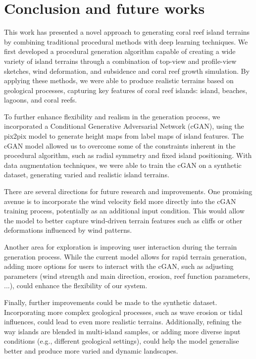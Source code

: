 \section{Conclusion and future works}
\label{sec:coral-island-conclusion}

This work has presented a novel approach to generating coral reef island terrains by combining traditional procedural methods with deep learning techniques. We first developed a procedural generation algorithm capable of creating a wide variety of island terrains through a combination of top-view and profile-view sketches, wind deformation, and subsidence and coral reef growth simulation. By applying these methods, we were able to produce realistic terrains based on geological processes, capturing key features of coral reef islands: island, beaches, lagoons, and coral reefs.

To further enhance flexibility and realism in the generation process, we incorporated a Conditional Generative Adversarial Network (cGAN), using the pix2pix model to generate height maps from label maps of island features. The cGAN model allowed us to overcome some of the constraints inherent in the procedural algorithm, such as radial symmetry and fixed island positioning. With data augmentation techniques, we were able to train the cGAN on a synthetic dataset, generating varied and realistic island terrains.


There are several directions for future research and improvements. One promising avenue is to incorporate the wind velocity field more directly into the cGAN training process, potentially as an additional input condition. This would allow the model to better capture wind-driven terrain features such as cliffs or other deformations influenced by wind patterns.

Another area for exploration is improving user interaction during the terrain generation process. While the current model allows for rapid terrain generation, adding more options for users to interact with the cGAN, such as adjusting parameters (wind strength and main direction, erosion, reef function parameters, ...), could enhance the flexibility of our system.

Finally, further improvements could be made to the synthetic dataset. Incorporating more complex geological processes, such as wave erosion or tidal influences, could lead to even more realistic terrains. Additionally, refining the way islands are blended in multi-island samples, or adding more diverse input conditions (e.g., different geological settings), could help the model generalise better and produce more varied and dynamic landscapes.

